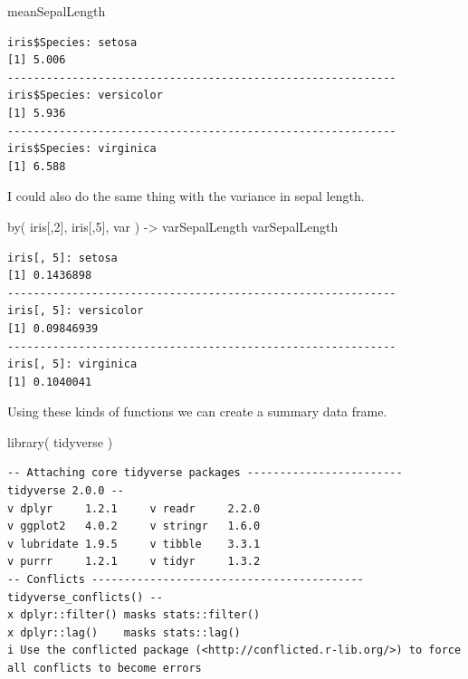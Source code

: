 \documentclass[
  letterpaper,
]{book}
\newenvironment{Shaded}{\begin{snugshade}}{\end{snugshade}}
\newcommand{\DecValTok}[1]{\textcolor[rgb]{0.68,0.00,0.00}{#1}}
\newcommand{\FunctionTok}[1]{\textcolor[rgb]{0.28,0.35,0.67}{#1}}
\newcommand{\NormalTok}[1]{\textcolor[rgb]{0.00,0.23,0.31}{#1}}
\newcommand{\OtherTok}[1]{\textcolor[rgb]{0.00,0.23,0.31}{#1}}
\begin{document}
\begin{Shaded}
\begin{Highlighting}[]
\NormalTok{meanSepalLength}
\end{Highlighting}
\end{Shaded}

\begin{verbatim}
iris$Species: setosa
[1] 5.006
------------------------------------------------------------ 
iris$Species: versicolor
[1] 5.936
------------------------------------------------------------ 
iris$Species: virginica
[1] 6.588
\end{verbatim}

I could also do the same thing with the variance in sepal length.

\begin{Shaded}
\begin{Highlighting}[]
\FunctionTok{by}\NormalTok{( iris[,}\DecValTok{2}\NormalTok{], iris[,}\DecValTok{5}\NormalTok{], var ) }\OtherTok{{-}\textgreater{}}\NormalTok{ varSepalLength}
\NormalTok{varSepalLength }
\end{Highlighting}
\end{Shaded}

\begin{verbatim}
iris[, 5]: setosa
[1] 0.1436898
------------------------------------------------------------ 
iris[, 5]: versicolor
[1] 0.09846939
------------------------------------------------------------ 
iris[, 5]: virginica
[1] 0.1040041
\end{verbatim}

Using these kinds of functions we can create a summary data frame.

\begin{Shaded}
\begin{Highlighting}[]
\FunctionTok{library}\NormalTok{( tidyverse )}
\end{Highlighting}
\end{Shaded}

\begin{verbatim}
-- Attaching core tidyverse packages ------------------------ tidyverse 2.0.0 --
v dplyr     1.2.1     v readr     2.2.0
v ggplot2   4.0.2     v stringr   1.6.0
v lubridate 1.9.5     v tibble    3.3.1
v purrr     1.2.1     v tidyr     1.3.2
-- Conflicts ------------------------------------------ tidyverse_conflicts() --
x dplyr::filter() masks stats::filter()
x dplyr::lag()    masks stats::lag()
i Use the conflicted package (<http://conflicted.r-lib.org/>) to force all conflicts to become errors
\end{verbatim}
\end{document}
